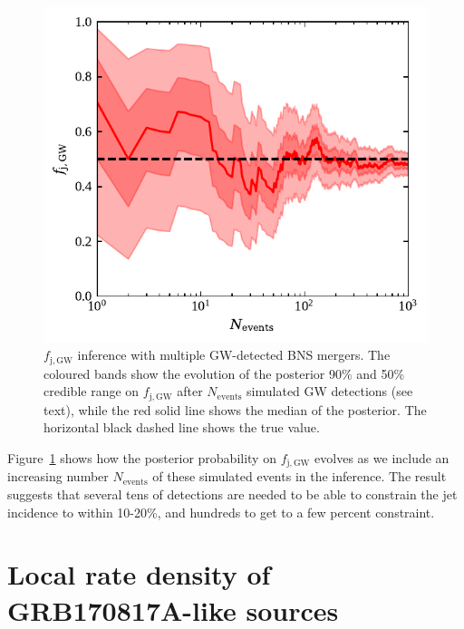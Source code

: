 \documentclass[]{aa}
\newcommand{\resp}[1]{#1}
\begin{document}
\begin{appendix}
\begin{figure}
 \centering\includegraphics[width=\columnwidth]{figures/multi_event_fjGW_inference.pdf}
 \caption{$f_\mathrm{j,GW}$ inference with multiple GW-detected BNS mergers. The coloured bands show the evolution of the posterior 90\% and 50\% credible range on $f_\mathrm{j,GW}$ after $N_\mathrm{events}$ simulated GW detections (see text), while the red solid line shows the median of the posterior. The horizontal black dashed line shows the true value.} 
 \label{fig:multi_event_fjGW_inference}
\end{figure}
%
Figure~\ref{fig:multi_event_fjGW_inference} shows how the posterior probability on $f_\mathrm{j,GW}$ evolves as we include an increasing number $N_\mathrm{events}$ of these simulated events in the inference. The result suggests that several tens of detections are needed to be able to constrain the jet \resp{incidence} to within 10-20\%, and hundreds to get to a few percent constraint.

\section{Local rate density of GRB170817A-like sources} \label{sec:local_sgrb_rate}


\end{appendix}
\end{document}
